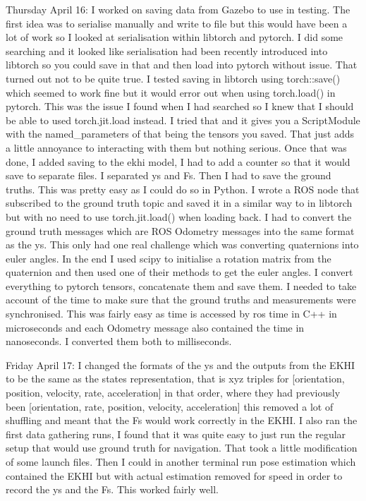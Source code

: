 \documentclass[]{../resources/final_report}
\begin{document}
\begin{appendices}
  Thursday April 16: I worked on saving data from Gazebo to use in testing. The first idea was to serialise manually and write to file but this would have been a lot of work so I looked at serialisation within libtorch and pytorch. I did some searching and it looked like serialisation had been recently introduced into libtorch so you could save in that and then load into pytorch without issue. That turned out not to be quite true. I tested saving in libtorch using torch::save() which seemed to work fine but it would error out when using torch.load() in pytorch. This was the issue I found when I had searched so I knew that I should be able to used torch.jit.load instead. I tried that and it gives you a ScriptModule with the named\_parameters of that being the tensors you saved. That just adds a little annoyance to interacting with them but nothing serious. Once that was done, I added saving to the ekhi model, I had to add a counter so that it would save to separate files. I separated ys and Fs. Then I had to save the ground truths. This was pretty easy as I could do so in Python. I wrote a ROS node that subscribed to the ground truth topic and saved it in a similar way to in libtorch but with no need to use torch.jit.load() when loading back. I had to convert the ground truth messages which are ROS Odometry messages into the same format as the ys. This only had one real challenge which was converting quaternions into euler angles. In the end I used scipy to initialise a rotation matrix from the quaternion and then used one of their methods to get the euler angles. I convert everything to pytorch tensors, concatenate them and save them. I needed to take account of the time to make sure that the ground truths and measurements were synchronised. This was fairly easy as time is accessed by ros time in C++ in microseconds and each Odometry message also contained the time in nanoseconds. I converted them both to milliseconds.

  Friday April 17: I changed the formats of the ys and the outputs from the EKHI to be the same as the states representation, that is xyz triples for [orientation, position, velocity, rate, acceleration] in that order, where they had previously been [orientation, rate, position, velocity, acceleration] this removed a lot of shuffling and meant that the Fs would work correctly in the EKHI. I also ran the first data gathering runs, I found that it was quite easy to just run the regular setup that would use ground truth for navigation. That took a little modification of some launch files. Then I could in another terminal run pose estimation which contained the EKHI but with actual estimation removed for speed in order to record the ys and the Fs. This worked fairly well.


\end{appendices}
\end{document}
